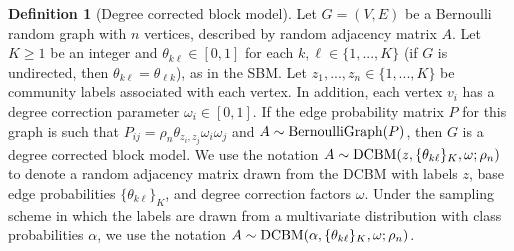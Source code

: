 \documentclass[
  11pt,
]{article}
\theoremstyle{definition}
\newtheorem{definition}{Definition}[section]
\theoremstyle{definition}
\theoremstyle{definition}
\theoremstyle{definition}
\theoremstyle{remark}
\begin{document}
\begin{definition}[Degree corrected block model]
\label{def:dcbm}
Let $G = (V, E)$ be a Bernoulli random graph with $n$ vertices, described by random adjacency matrix $A$. 
Let $K \geq 1$ be an integer and $\theta_{k \ell} \in [0, 1]$ for each $k, \ell \in \{1, ..., K\}$ (if $G$ is undirected, then $\theta_{k \ell} = \theta_{\ell k}$), as in the SBM. 
Let $z_1, ..., z_n \in \{1, ..., K\}$ be community labels associated with each vertex. 
In addition, each vertex $v_i$ has a degree correction parameter $\omega_i \in [0, 1]$. 
If the edge probability matrix $P$ for this graph is such that $P_{ij} = \rho_n \theta_{z_i, z_j} \omega_i \omega_j$ and $A \sim \mathrm{BernoulliGraph}(P)$, then $G$ is a degree corrected block model. 
We use the notation $A \sim \mathrm{DCBM}(z, \{\theta_{k \ell}\}_K, \omega; \rho_n)$ to denote a random adjacency matrix drawn from the DCBM with labels $z$, base edge probabilities $\{\theta_{k \ell}\}_K$, and degree correction factors $\omega$. 
Under the sampling scheme in which the labels are drawn from a multivariate distribution with class probabilities $\alpha$, we use the notation $A \sim \mathrm{DCBM}(\alpha, \{\theta_{k \ell}\}_K, \omega; \rho_n)$.
\end{definition}
\end{document}
